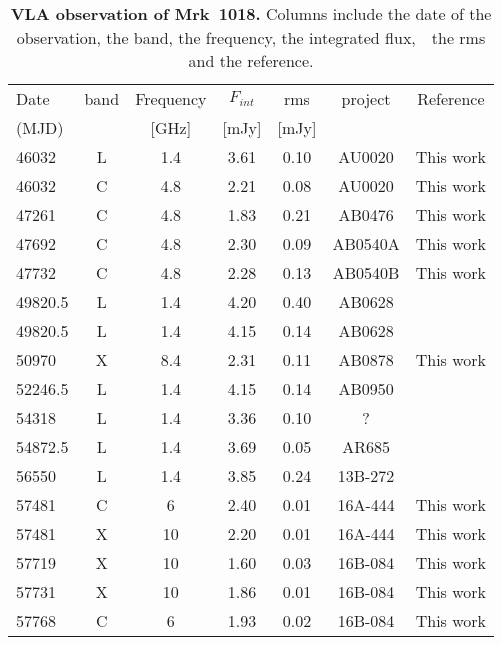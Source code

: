 \begin{table}
\centering
\label{tab:table2}
\caption{{ \bf VLA observation of Mrk~1018.} Columns include the date of the observation, the band, the frequency, the integrated flux,　the rms and the reference. }
\begin{tabular}{lcccccc}
\hline
\hline
 
 Date &   band  & Frequency  &$F_{int}$  &  rms & project & Reference  \\ 
 (MJD)&                   &   [GHz]   &[mJy]     &[mJy] &                    &            
 \\ \hline
46032 & L & 1.4 & 3.61 & 0.10 & AU0020 &  This work\\ 
46032 & C & 4.8 & 2.21 & 0.08 & AU0020 &  This work\\ 
47261 & C & 4.8 & 1.83 & 0.21 & AB0476 &  This work\\ 
47692 & C & 4.8 & 2.30 & 0.09 & AB0540A &  This work\\ 
47732 & C & 4.8 & 2.28 & 0.13 & AB0540B &  This work\\ 
49820.5 & L & 1.4 & 4.20 & 0.40 & AB0628 & \citet{1998AJ....115.1693C} \\ 
49820.5 & L & 1.4 & 4.15 & 0.14 & AB0628 & \citet{1997ApJ...475..479W} \\ 
50970 & X & 8.4 & 2.31 & 0.11 & AB0878 &  This work\\ 
52246.5 & L & 1.4 & 4.15 & 0.14 & AB0950 & \citet{2003yCat.8071....0B} \\ 
54318 & L & 1.4 & 3.36 & 0.10 & ? & \citet{2012yCat.8090....0B} \\ 
54872.5 & L & 1.4 & 3.69 & 0.05 & AR685 & \citet{2011AJ....142....3H} \\ 
56550 & L & 1.4 & 3.85 & 0.24 & 13B-272 & \citet{2016MNRAS.460.4433H} \\ 
57481 & C & 6 & 2.40 & 0.01 & 16A-444 &  This work\\ 
57481 & X & 10 & 2.20 & 0.01 & 16A-444 &  This work\\ 
57719 & X & 10 & 1.60 & 0.03 & 16B-084 &  This work\\ 
57731 & X & 10 & 1.86 & 0.01 & 16B-084 &  This work\\ 
57768 & C & 6 & 1.93 & 0.02 & 16B-084 &  This work\\ \hline 
\end{tabular}   
\end{table}



